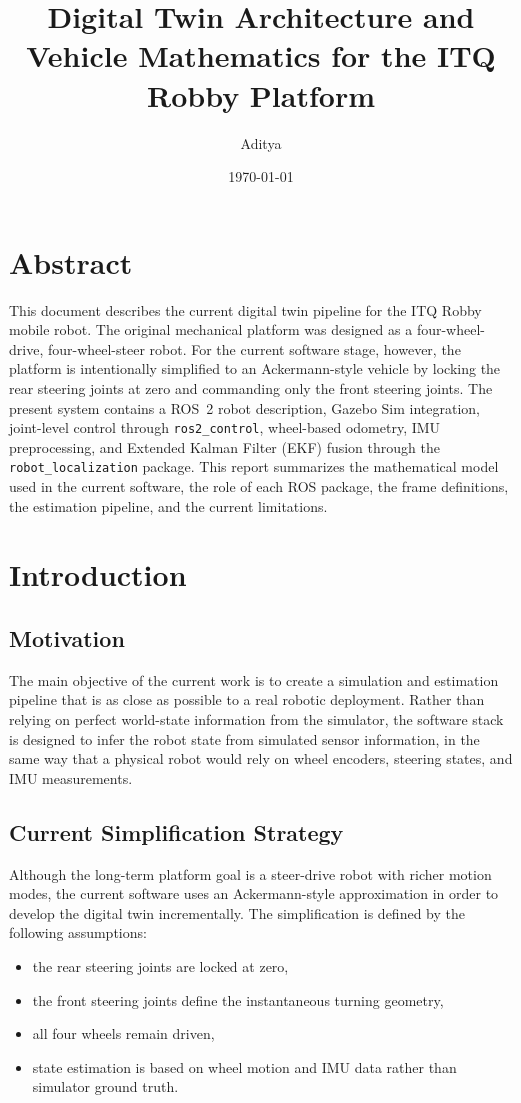 \documentclass[12pt,a4paper]{report}
\title{Digital Twin Architecture and Vehicle Mathematics for the ITQ Robby Platform}
\author{Aditya}
\date{\today}
\begin{document}
\maketitle
\tableofcontents
\clearpage

\chapter*{Abstract}
This document describes the current digital twin pipeline for the ITQ Robby mobile robot. The original mechanical platform was designed as a four-wheel-drive, four-wheel-steer robot. For the current software stage, however, the platform is intentionally simplified to an Ackermann-style vehicle by locking the rear steering joints at zero and commanding only the front steering joints. The present system contains a ROS~2 robot description, Gazebo Sim integration, joint-level control through \texttt{ros2\_control}, wheel-based odometry, IMU preprocessing, and Extended Kalman Filter (EKF) fusion through the \texttt{robot\_localization} package. This report summarizes the mathematical model used in the current software, the role of each ROS package, the frame definitions, the estimation pipeline, and the current limitations.

\chapter{Introduction}

\section{Motivation}
The main objective of the current work is to create a simulation and estimation pipeline that is as close as possible to a real robotic deployment. Rather than relying on perfect world-state information from the simulator, the software stack is designed to infer the robot state from simulated sensor information, in the same way that a physical robot would rely on wheel encoders, steering states, and IMU measurements.

\section{Current Simplification Strategy}
Although the long-term platform goal is a steer-drive robot with richer motion modes, the current software uses an Ackermann-style approximation in order to develop the digital twin incrementally. The simplification is defined by the following assumptions:
\begin{itemize}[leftmargin=*]
  \item the rear steering joints are locked at zero,
  \item the front steering joints define the instantaneous turning geometry,
  \item all four wheels remain driven,
  \item state estimation is based on wheel motion and IMU data rather than simulator ground truth.
\end{itemize}
\end{document}
